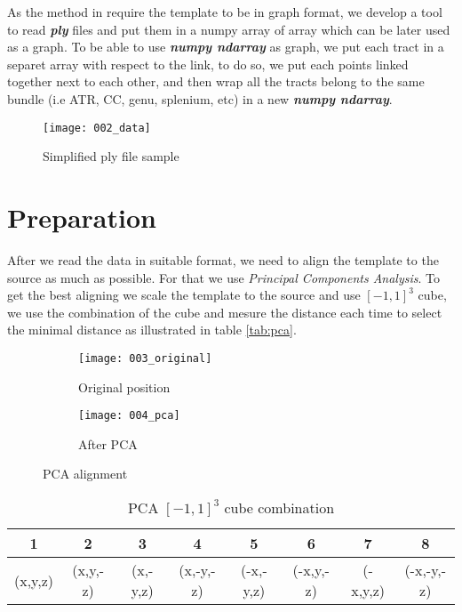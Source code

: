 \documentclass[../structure.tex]{subfiles}
\begin{document}
As the method in \cite{Amberg2007} require the template to be in graph format, we develop a tool to read \textbf{\textit{ply}} files and put them in a numpy array of array which can be later used as a graph. To be able to use \textbf{\textit{numpy ndarray}} as graph, we put each tract in a separet array with respect to the link, to do so, we put each points linked together next to each other, and then wrap all the tracts belong to the same bundle (i.e ATR, CC, genu, splenium, etc) in a new \textbf{\textit{numpy ndarray}}.

\begin{figure}[h]
\centering
\texttt{[image: 002\_data]}
\captionsetup{justification=centering}
\caption{Simplified ply file sample}
\label{fig:data}
\end{figure}

\section{Preparation}
After we read the data in suitable format, we need to align the template to the source as much as possible. For that we use \textit{Principal Components Analysis}. To get the best aligning we scale the template to the source and use $[-1,1]^3$ cube, we use the combination of the cube and mesure the distance each time to select the minimal distance as illustrated in table \ref{tab:pca}.

\begin{figure}[h]
	\centering
	\begin{subfigure}[b]{0.59\textwidth}
	\texttt{[image: 003\_original]}
	\caption{Original position}
	\end{subfigure}
	\begin{subfigure}[b]{0.39\textwidth}
	\texttt{[image: 004\_pca]}
	\caption{After PCA}
	\end{subfigure}
\label{fig:pca}
\caption{PCA alignment}
\end{figure}

\pagebreak

\begin{center}
\begin{table}[h]
	\begin{tabular}{| c | c | c | c | c | c | c | c |}
	\hline
	1 & 2 & 3 & 4 & 5 & 6 & 7 & 8\\
	\hline
	(x,y,z) & (x,y,-z) & (x,-y,z) & (x,-y,-z) & (-x,-y,z) & (-x,y,-z) & (-x,y,z) & (-x,-y,-z)\\
	\hline
	\end{tabular}
\caption{PCA $[-1,1]^3$ cube combination}
\label{table:pca}
\end{table}
\end{center}
\end{document}
